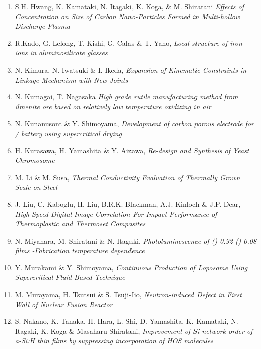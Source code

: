 \begin{enumerate}[label=A\arabic*]
\item S.H. Hwang, K. Kamataki, N. Itagaki, K. Koga, \& M. Shiratani {\em Effects of  Concentration on Size of
Carbon Nano-Particles Formed in Multi-hollow
Discharge Plasma}

\item R.Kado, G. Lelong, T. Kishi, G. Calas \& T. Yano, {\em Local structure of iron ions
in aluminosilicate glasses}

\item N. Kimura, N. Iwatsuki \& I. Ikeda, {\em Expansion of Kinematic Constraints in Linkage
Mechanism with New Joints}

\item N. Kumagai, T. Nagasaka {\em High grade rutile manufacturing method from ilmenite ore based on relatively low temperature oxidizing in air}

\item     N. Kunanusont \& Y. Shimoyama, {\em Development of carbon porous electrode
for  / battery using supercritical drying}

\item  H. Kurasawa, H. Yamashita \& Y. Aizawa, {\em Re-design and Synthesis of Yeast Chromosome}

\item M. Li \& M. Susa, {\em Thermal Conductivity Evaluation of Thermally
Grown  Scale on Steel}

\item J. Liu, C. Kaboglu, H. Liu, B.R.K. Blackman, A.J. Kinloch \& J.P. Dear, {\em
  High Speed Digital Image Correlation For Impact
Performance of Thermoplastic and Thermoset
Composites}

\item N. Miyahara, M. Shiratani \& N. Itagaki, {\em Photoluminescence of () 0.92 () 0.08 films
-Fabrication temperature dependence}

\item Y. Murakami \& Y. Shimoyama, {\em Continuous Production of Loposome
Using Supercritical-Fluid-Based Technique}

\item M. Murayama, H. Tsutsui \& S. Tsuji-Iio, {\em Neutron-induced Defect in First Wall of Nuclear
Fusion Reactor}

\item S. Nakano, K. Tanaka, H. Hara, L. Shi, D. Yamashita,
K. Kamataki, N. Itagaki, K. Koga \& Masaharu Shiratani, {\em Improvement of Si network order of a-Si:H thin
films by suppressing incorporation of
HOS molecules}


\end{enumerate}
